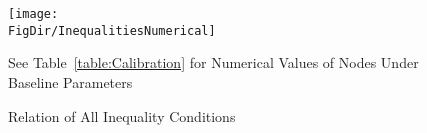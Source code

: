\begin{figure}[ht]
  \centerline{
    \texttt{[image: \\FigDir/InequalitiesNumerical]}
  }
  \caption{Relation of All Inequality Conditions} \label{fig:InequalitiesNumerical}
\centerline{See Table~\ref{table:Calibration} for Numerical Values of Nodes Under Baseline Parameters}
\end{figure}
